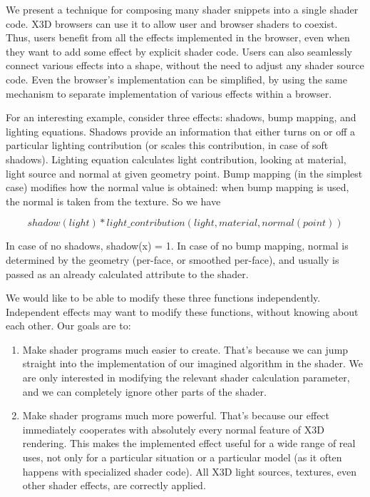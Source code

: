 \documentclass{acmsiggraph}                     %
\begin{document}
\copyrightspace

We present a technique for composing many shader snippets into a
single shader code. X3D browsers can use it to allow user and browser
shaders to coexist. Thus, users benefit from all the effects
implemented in the browser, even when they want to add some effect by
explicit shader code. Users can also seamlessly connect various
effects into a shape, without the need to adjust any shader source
code. Even the browser's implementation can be simplified, by using
the same mechanism to separate implementation of various effects
within a browser.

For an interesting example, consider three effects: shadows, bump
mapping, and lighting equations. Shadows provide an information that
either turns on or off a particular lighting contribution (or scales
this contribution, in case of soft shadows). Lighting equation
calculates light contribution, looking at material, light source and
normal at given geometry point. Bump mapping
\cite{vrmleng:bumpmapping} (in the simplest case)
modifies how the normal value is obtained: when bump mapping is used,
the normal is taken from the texture. So we have

$$ shadow(light) * light\_contribution(light, material, normal(point)) $$

In case of no shadows, shadow(x) = 1. In case of no bump mapping,
normal is determined by the geometry (per-face, or smoothed per-face),
and usually is passed as an already calculated attribute to the
shader.

We would like to be able to modify these three functions independently.
Independent effects may want to modify these functions, without knowing
about each other. Our goals are to:

\begin{enumerate}
\item Make shader programs much easier to create. That's because we
  can jump straight into the implementation of our imagined algorithm
  in the shader.
  We are only interested in modifying the relevant shader calculation
  parameter, and we can completely ignore other parts of the shader.

\item Make shader programs much more powerful. That's because our effect
  immediately cooperates with absolutely every normal feature of X3D rendering.
  This makes the implemented effect useful for a wide range of real uses,
  not only for a particular situation or a particular model (as it often happens
  with specialized shader code).
  All X3D light sources, textures, even other shader effects,
  are correctly applied.
\end{enumerate}
\end{document}
